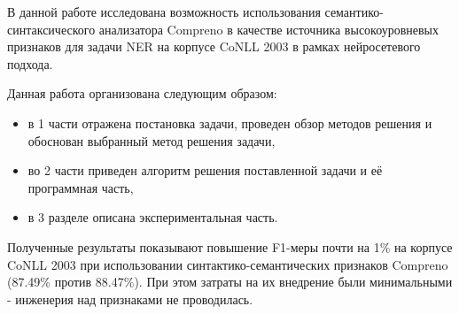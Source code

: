   В данной работе исследована возможность использования семантико-синтаксического
  анализатора Compreno в качестве источника высокоуровневых признаков для задачи
  NER на корпусе CoNLL 2003 в рамках нейросетевого подхода.

  Данная работа организована следующим образом:
  \begin{itemize}
    \item в 1 части отражена постановка задачи, проведен обзор методов решения и обоснован выбранный метод решения задачи,
    \item во 2 части приведен алгоритм решения поставленной задачи и её программная часть,
    \item в 3 разделе описана экспериментальная часть.
  \end{itemize}

  Полученные результаты показывают повышение F1-меры почти на 1\% на корпусе CoNLL 2003
  при использовании синтактико-семантических признаков Compreno (87.49\% против 88.47\%).
  При этом затраты на их внедрение были минимальными - инженерия над признаками не проводилась.
